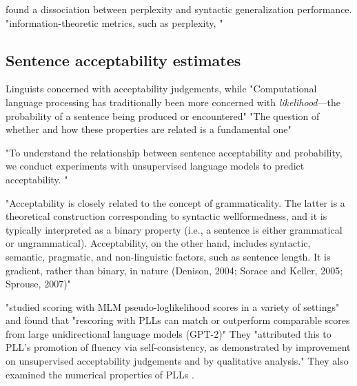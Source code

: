 \citet{hu2020systematic} found a dissociation between perplexity and syntactic generalization performance.
"information-theoretic metrics, such as perplexity, "  \citep{hu2020systematic}


\subsection{Sentence acceptability estimates}

Linguists concerned with acceptability judgements, while "Computational language processing has traditionally been more
concerned with \textit{likelihood}—the probability of a
sentence being produced or encountered" \cite{lau2020furiously}
"The question of whether and how these properties are related is a fundamental one" \citep{lau2020furiously}

"To understand the relationship between sentence acceptability and probability, we conduct experiments with unsupervised language models
to predict acceptability. " \citep{lau2020furiously}

"Acceptability is closely related to the concept of grammaticality. The latter is a theoretical construction corresponding to syntactic wellformedness, and it is typically interpreted as a binary property (i.e., a sentence is either grammatical or ungrammatical). Acceptability, on the other hand, includes syntactic, semantic, pragmatic, and non-linguistic factors, such as sentence
length. It is gradient, rather than binary, in nature
(Denison, 2004; Sorace and Keller, 2005; Sprouse,
2007)" \citep{lau2020furiously}


\citet{salazar2020masked} "studied scoring with MLM pseudo-loglikelihood scores in a variety of settings" and found that "rescoring with PLLs can match or outperform comparable scores from large unidirectional language models (GPT-2)" They "attributed this to PLL’s promotion of fluency via self-consistency, as demonstrated by improvement on unsupervised acceptability judgements and by qualitative analysis."
They also examined the numerical properties of PLLs \citep{salazar2020masked}.

